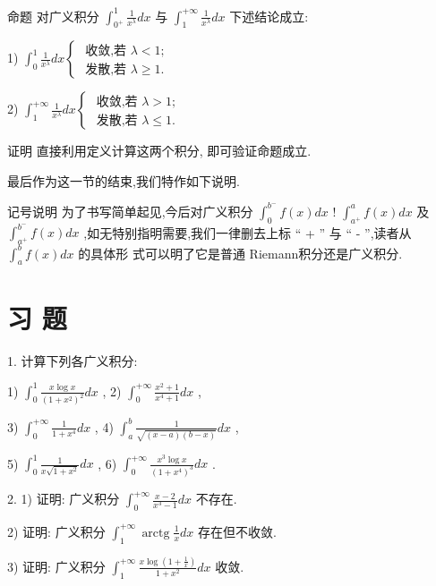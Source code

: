 命题 对广义积分 ${\int }_{{0}^{ + }}^{1}\frac{1}{{x}^{\lambda }}{dx}$ 与 ${\int }_{1}^{+\infty }\frac{1}{{x}^{\lambda }}{dx}$ 下述结论成立:

1) ${\int }_{0}^{1}\frac{1}{{x}^{\lambda }}{dx}\left\{  \begin{array}{l} \text{ 收敛,若 }\lambda  < 1; \\  \text{ 发散,若 }\lambda  \geq  1. \end{array}\right.$

2) ${\int }_{1}^{+\infty }\frac{1}{{x}^{\lambda }}{dx}\left\{  \begin{array}{l} \text{ 收敛,若 }\lambda  > 1; \\  \text{ 发散,若 }\lambda  \leq  1. \end{array}\right.$

证明 直接利用定义计算这两个积分, 即可验证命题成立.

最后作为这一节的结束,我们特作如下说明.

记号说明 为了书写简单起见,今后对广义积分 ${\int }_{0}^{{b}^{ - }}f\left( x\right) {dx}$ ! ${\int }_{{a}^{ + }}^{a}f\left( x\right) {dx}$ 及 ${\int }_{{a}^{ + }}^{{b}^{ - }}f\left( x\right) {dx}$ ,如无特别指明需要,我们一律删去上标 “ + ” 与 “ - ”,读者从 ${\int }_{a}^{b}f\left( x\right) {dx}$ 的具体形 式可以明了它是普通 Riemann积分还是广义积分.

\section*{习 题}

1. 计算下列各广义积分:

1) ${\int }_{0}^{1}\frac{x\log x}{{\left( 1 + {x}^{2}\right) }^{2}}{dx}$ , 2) ${\int }_{0}^{+\infty }\frac{{x}^{2} + 1}{{x}^{4} + 1}{dx}$ ,

3) ${\int }_{0}^{+\infty }\frac{1}{1 + {x}^{4}}{dx}$ , 4) ${\int }_{a}^{b}\frac{1}{\sqrt{\left( {x - a}\right) \left( {b - x}\right) }}{dx}$ ,

5) ${\int }_{0}^{1}\frac{1}{x\sqrt{1 + {x}^{2}}}{dx}$ , 6) ${\int }_{0}^{+\infty }\frac{{x}^{3}\log x}{{\left( 1 + {x}^{4}\right) }^{3}}{dx}$ .

2. 1) 证明: 广义积分 ${\int }_{0}^{+\infty }\frac{x - 2}{{x}^{3} - 1}{dx}$ 不存在.

2) 证明: 广义积分 ${\int }_{1}^{+\infty }\operatorname{arctg}\frac{1}{x}{dx}$ 存在但不收敛.

3) 证明: 广义积分 ${\int }_{1}^{+\infty }\frac{x\log \left( {1 + \frac{1}{x}}\right) }{1 + {x}^{2}}{dx}$ 收敛.

